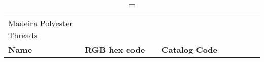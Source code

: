 
\begin{longtable}{p{0.3\linewidth} p{0.3\linewidth} p{0.4\linewidth}}
\caption = {Madeira Polyester Threads}
\label{tblr:madeirapoly}\\
\textbf{Name} & \textbf{RGB hex code} & \textbf{Catalog Code} \\

\end{longtable}
